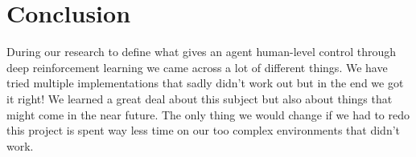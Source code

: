 \documentclass[12pt, conference, compsoc]{IEEEtran}
\begin{document}
\section{Conclusion}
During our research to define what gives an agent human-level control through deep reinforcement learning we came across a lot of different things. We have tried multiple implementations that sadly didn't work out but in the end we got it right! We learned a great deal about this subject but also about things that might come in the near future. The only thing we would change if we had to redo this project is spent way less time on our too complex environments that didn't work. 

%
%



%
%
\end{document}
